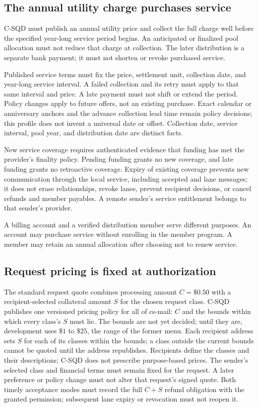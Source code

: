 \documentclass[11pt]{article}
\begin{document}
\subsection{The annual utility charge purchases service}

C-SQD must publish an annual utility price and collect the full charge well
before the specified year-long service period begins. An anticipated or finalized
pool allocation must not reduce that charge at collection. The later distribution
is a separate bank payment; it must not shorten or revoke purchased service.

Published service terms must fix the price, settlement unit, collection date,
and year-long service interval. A failed collection and its retry must apply to
that same interval and price. A late payment must not shift or extend the period.
Policy changes apply to future offers, not an existing purchase. Exact calendar
or anniversary anchors and the advance collection lead time remain policy
decisions; this profile does not invent a universal date or offset. Collection
date, service interval, pool year, and distribution date are distinct facts.

New service coverage requires authenticated evidence that funding has met the
provider's finality policy. Pending funding grants no new coverage, and late
funding grants no retroactive coverage. Expiry of existing coverage prevents new
communication through the local service, including accepted and lane messages;
it does not erase relationships, revoke lanes, prevent recipient decisions, or
cancel refunds and member payables. A remote sender's service entitlement belongs
to that sender's provider.

A billing account and a verified distribution member serve different purposes.
An account may purchase service without enrolling in the member program. A member
may retain an annual allocation after choosing not to renew service.

\subsection{Request pricing is fixed at authorization}

The standard request quote combines processing amount $C=\$0.50$ with a
recipient-selected collateral amount $S$ for the chosen request class. C-SQD
publishes one versioned pricing policy for all of cs-mail: $C$ and the bounds
within which every class's $S$ must lie. The bounds are not yet decided; until
they are, development uses $\$1$ to $\$25$, the range of the former menu. Each
recipient address sets $S$ for each of its classes within the bounds; a class
outside the current bounds cannot be quoted until the address republishes. Recipients define the
classes and their descriptions; C-SQD does not prescribe purpose-based prices.
The sender's selected class and financial terms must remain fixed for the request.
A later preference or policy change must not alter that request's signed quote.
Both timely acceptance modes must record the full $C+S$ refund obligation with
the granted permission; subsequent lane expiry or revocation must not reopen it.
\end{document}
